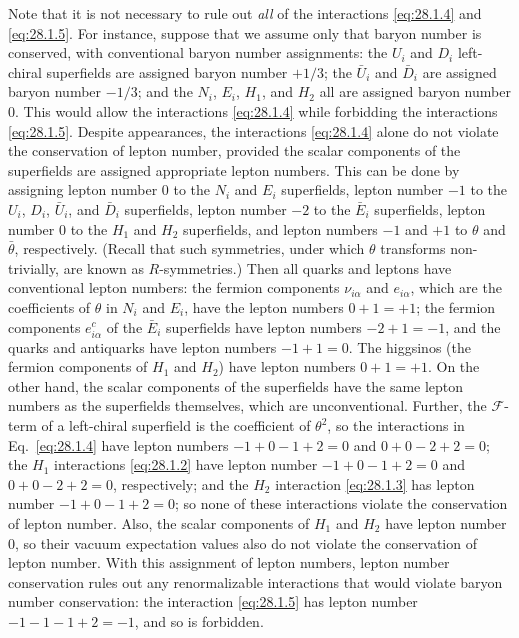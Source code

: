Note that it is not necessary to rule out \textit{all} of the
interactions \eqref{eq:28.1.4} and \eqref{eq:28.1.5}. For instance,
suppose that we assume only that baryon number is conserved, with
conventional baryon number assignments: the \(U_i\) and \(D_i\)
left-chiral superfields are assigned baryon number \(+1/3\); the
\(\bar U_i\) and \(\bar D_i\) are assigned baryon number \(-1/3\); and
the \(N_i\), \(E_i\), \(H_1\), and \(H_2\) all are assigned baryon
number 0. This would allow the interactions \eqref{eq:28.1.4} while
forbidding the interactions \eqref{eq:28.1.5}. Despite appearances, the
interactions \eqref{eq:28.1.4} alone do not violate the conservation of
lepton number, provided the scalar components of the superfields are
assigned appropriate lepton numbers. This can be done by assigning
lepton number 0 to the \(N_i\) and \(E_i\) superfields, lepton number
\(-1\) to the \(U_i\), \(D_i\), \(\bar U_i\), and \(\bar D_i\)
superfields, lepton number \(-2\) to the \(\bar E_i\) superfields,
lepton number 0 to the \(H_1\) and \(H_2\) superfields, and lepton
numbers \(-1\) and \(+1\) to \(\theta\) and \(\bar\theta\),
respectively. (Recall that such symmetries, under which \(\theta\)
transforms non-trivially, are known as \(R\)-symmetries.) Then all quarks
and leptons have conventional lepton numbers: the fermion components
\(\nu_{i\alpha}\) and \(e_{i\alpha}\), which are the coefficients of
\(\theta\)
in \(N_i\) and \(E_i\), have the lepton numbers \(0+1=+1\); the fermion
components \(e^c_{i\alpha}\) of the \(\bar E_i\) superfields have lepton
numbers \(-2+1=-1\), and the quarks and antiquarks have lepton numbers
\(-1+1=0\). The higgsinos (the fermion components of \(H_1\) and
\(H_2\)) have lepton numbers \(0+1=+1\). On the other hand, the scalar
components of the superfields have the same lepton numbers as the
superfields themselves, which are unconventional. Further, the
\(\mathcal{F}\)-term of a left-chiral superfield is the coefficient of
\(\theta^2\), so the interactions in Eq.~\eqref{eq:28.1.4} have
lepton numbers \(-1+0-1+2=0\) and \(0+0-2+2=0\); the \(H_1\)
interactions \eqref{eq:28.1.2} have lepton number
\(-1+0-1+2=0\) and \(0+0-2+2=0\), respectively; and the \(H_2\)
interaction \eqref{eq:28.1.3} has lepton number
\(-1+0-1+2=0\); so none of these interactions violate the conservation
of lepton number. Also, the scalar components of \(H_1\) and \(H_2\)
have lepton number 0, so their vacuum expectation values also do not
violate the conservation of lepton number. With this assignment of
lepton numbers, lepton number conservation rules out any renormalizable
interactions that would violate baryon number conservation: the
interaction \eqref{eq:28.1.5} has lepton number
\(-1-1-1+2=-1\), and so is forbidden.

